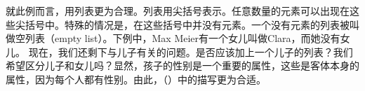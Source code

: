 就此例而言，用列表更为合理。列表用尖括号表示。任意数量的元素可以出现在这些尖括号中。特殊的情况是，在这些括号中并没有元素。一个没有元素的列表被叫做空列表（empty list）。下例中，Max Meier有一个女儿叫做Clara，而她没有女儿。
\ea
{}
\z
现在，我们还剩下与儿子有关的问题。是否应该加上一个儿子的列表？我们希望区分儿子和女儿吗？显然，孩子的性别是一个重要的属性，这些是客体本身的属性，因为每个人都有性别。由此，（）中的描写更为合适。

